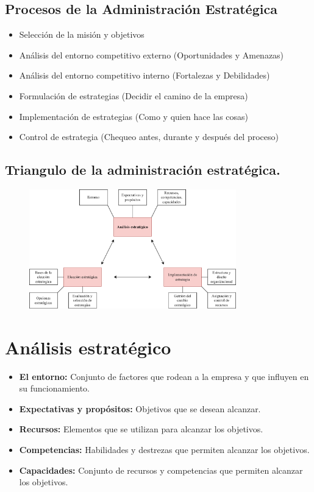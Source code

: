 \documentclass{templateNote}
\begin{document}
\subsection{Procesos de la Administración Estratégica}
\begin{itemize}
    \item Selección de la misión y objetivos
    \item Análisis del entorno competitivo externo (Oportunidades y Amenazas)       
    \item Análisis del entorno competitivo interno (Fortalezas y Debilidades)
    \item Formulación de estrategias (Decidir el camino de la empresa)
    \item Implementación de estrategias (Como y quien hace las cosas)
    \item Control de estrategia (Chequeo antes, durante y después del proceso)
\end{itemize}

\subsection{Triangulo de la administración estratégica.}
\begin{figure}[H]
    \centering
    \includegraphics[width=0.8\textwidth]{img/triangulo.png}
\end{figure}
\newpage


\section{Análisis estratégico}
\begin{itemize}
    \item \textbf{El entorno:} Conjunto de factores que rodean a la empresa y que influyen en su funcionamiento.
    \item \textbf{Expectativas y propósitos:} Objetivos que se desean alcanzar.
    \item \textbf{Recursos:} Elementos que se utilizan para alcanzar los objetivos.
    \item \textbf{Competencias:} Habilidades y destrezas que permiten alcanzar los objetivos.
    \item \textbf{Capacidades:} Conjunto de recursos y competencias que permiten alcanzar los objetivos.
\end{itemize}
\end{document}
